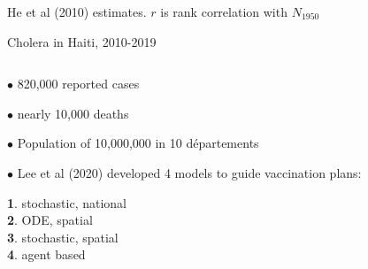 \documentclass{beamer}
\begin{document}
\begin{frame}{He et al (2010) estimates. $r$ is rank correlation with $N_{1950}$}
\end{frame}


\begin{frame}{Cholera in Haiti, 2010-2019}


  
\begin{columns}[T] %

\begin{column}{.35\textwidth}
  \vspace{2mm}
  
  $\bullet$  820,000 reported cases

  \vspace{4mm}
  
  $\bullet$ nearly 10,000 deaths

    \vspace{4mm}

$\bullet$  Population of 10,000,000 in 10 d\'{e}partements

    \vspace{4mm}
    
    $\bullet$  Lee et al (2020) developed 4 models to guide vaccination plans:

    
    \vspace{1mm}
    
    {\bf 1}. stochastic, national \\
    {\bf 2}. ODE, spatial \\
    {\bf 3}. stochastic, spatial\\
    {\bf 4}. agent based


\end{column}
\end{columns}
\end{frame}
\end{document}
